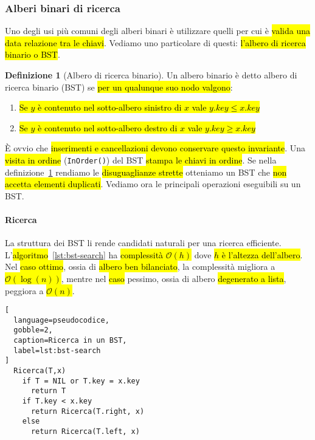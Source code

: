 \documentclass[a4paper,11pt,twoside]{article}
\theoremstyle{plain}
\theoremstyle{definition}
\newtheorem{defn}{Definizione}[section]
\theoremstyle{remark}
\begin{document}
\subsubsection{Alberi binari di ricerca}\label{sec:bst}

Uno degli usi più comuni degli alberi binari è utilizzare quelli per cui è
\hl{valida una data relazione tra le chiavi}. Vediamo uno particolare di questi:
\hl{l'albero di ricerca binario o BST}.

\begin{defn}[Albero di ricerca binario]\label{def:bst}
  Un albero binario è detto albero di ricerca binario (BST) se \hl{per un
  qualunque suo nodo valgono}:

  \begin{enumerate}
    \item \hl{Se $y$ è contenuto nel sotto-albero sinistro di $x$ vale
      $y.key \leq x.key$}
    \item \hl{Se $y$ è contenuto nel sotto-albero destro di $x$ vale
      $y.key \geq x.key$}
  \end{enumerate}
\end{defn}

È ovvio che \hl{inserimenti e cancellazioni devono conservare questo invariante}.
Una \hl{visita in ordine} (\texttt{InOrder()}) del BST \hl{stampa le chiavi in ordine}.
Se nella definizione~\ref{def:bst} rendiamo le \hl{disuguaglianze strette} otteniamo
un BST che \hl{non accetta elementi duplicati}. Vediamo ora le principali operazioni
eseguibili su un BST.

\paragraph{Ricerca} La struttura dei BST li rende candidati naturali per una
ricerca efficiente. L'\hl{algoritmo}~\ref{lst:bst-search} ha \hl{complessità
$\mathcal{O}(h)$} dove \hl{$h$ è l'altezza dell'albero}. Nel \hl{caso ottimo},
ossia di \hl{albero ben bilanciato}, la complessità migliora a
\hl{$\mathcal{O}(\log(n))$}, mentre nel \hl{caso} pessimo, ossia di albero
\hl{degenerato a lista}, peggiora a \hl{$\mathcal{O}(n)$}.

\begin{lstlisting}[
  language=pseudocodice,
  gobble=2,
  caption=Ricerca in un BST,
  label=lst:bst-search
]
  Ricerca(T,x)
    if T = NIL or T.key = x.key
      return T
    if T.key < x.key
      return Ricerca(T.right, x)
    else
      return Ricerca(T.left, x)
\end{lstlisting}
\end{document}
